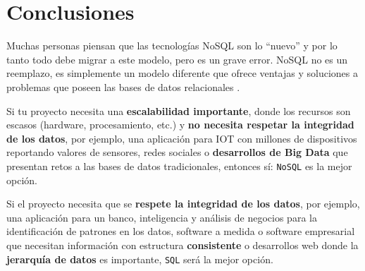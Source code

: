 \section{Conclusiones}

Muchas personas piensan que las tecnologías NoSQL son lo “nuevo” y por lo tanto todo debe migrar a este modelo, pero es un grave error. NoSQL no es un reemplazo, es simplemente un modelo diferente que ofrece ventajas y soluciones a problemas que poseen las bases de datos relacionales \cite{ref8}.

Si tu proyecto necesita una \textbf{escalabilidad importante}, donde los recursos son escasos (hardware, procesamiento, etc.) y \textbf{no necesita respetar la integridad de los datos}, por ejemplo, una aplicación para IOT con millones de dispositivos reportando valores de sensores, redes sociales o \textbf{desarrollos de Big Data} que presentan retos a las bases de datos tradicionales, entonces sí: \texttt{NoSQL} es la mejor opción.

Si el proyecto necesita que se \textbf{respete la integridad de los datos}, por ejemplo, una aplicación para un banco, inteligencia y análisis de negocios para la identificación de patrones en los datos, software a medida o software empresarial que necesitan información con estructura \textbf{consistente} o desarrollos web donde la \textbf{jerarquía de datos} es importante, \texttt{SQL} será la mejor opción.


\newpage